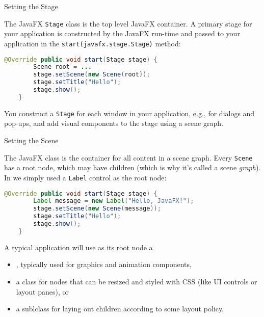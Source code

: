 \documentclass{beamer}
\begin{document}
\begin{frame}[fragile]{Setting the Stage}

The JavaFX {\tt Stage} class is the top level JavaFX container.  A primary stage for your application is constructed by the JavaFX run-time and passed to your application in the {\tt start(javafx.stage.Stage)} method:

\begin{lstlisting}[language=Java]
    @Override public void start(Stage stage) {
        Scene root = ...
        stage.setScene(new Scene(root));
        stage.setTitle("Hello");
        stage.show();
    }
\end{lstlisting}

You construct a {\tt Stage} for each window in your application, e.g., for dialogs and pop-ups, and add visual components to the stage using a scene graph.

\end{frame}

\begin{frame}[fragile]{Setting the Scene}

The JavaFX  class is the container for all content in a scene graph.  Every {\tt Scene} has a root node, which may have children (which is why it's called a scene {\it graph}).  In  we simply used a {\tt Label} control as the root node:

\begin{lstlisting}[language=Java]
    @Override public void start(Stage stage) {
        Label message = new Label("Hello, JavaFX!");
        stage.setScene(new Scene(message));
        stage.setTitle("Hello");
        stage.show();
    }
\end{lstlisting}

A typical application will use as its root node a
\begin{itemize}
  \item {}, typically used for graphics and animation components,
\item a  class for nodes that can be resized and styled with CSS (like UI controls or layout panes), or
\item a  sublclass for laying out children according to some layout policy.
\end{itemize}

\end{frame}
\end{document}
